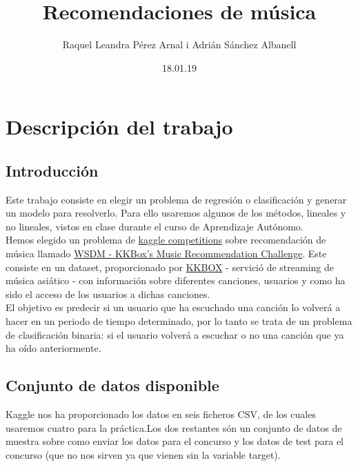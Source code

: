 \documentclass[a4paper]{article}
\title{Recomendaciones de música}
\author{Raquel Leandra Pérez Arnal i Adrián Sánchez Albanell}
\date{18.01.19} %
\begin{document}
\begin{titlepage}
\maketitle
\thispagestyle{empty}
\end{titlepage}
\cleardoublepage
\tableofcontents
\clearpage

\section{Descripción del trabajo}


\subsection{Introducción}
Este trabajo consiste en elegir un problema de regresión o clasificación y generar un modelo para resolverlo. Para ello usaremos algunos de los métodos, lineales y no lineales, vistos en clase durante el curso de Aprendizaje Autónomo.\\
Hemos elegido un problema de \href{https://www.kaggle.com/competitions}{kaggle competitions} sobre recomendación de música llamado \href{https://www.kaggle.com/c/kkbox-music-recommendation-challenge}{WSDM - KKBox's Music Recommendation Challenge}. Este consiste en un dataset, proporcionado por \href{https://www.kkbox.com/intl/index.php?area=intl}{KKBOX} - servició de streaming de música asiático - con información sobre diferentes canciones, usuarios y como ha sido el acceso de los usuarios a dichas canciones.\\
El objetivo es predecir si un usuario que ha escuchado una canción lo volverá a hacer en un periodo de tiempo determinado, por lo tanto se trata de un problema de clasificación binaria: si el usuario volverá a escuchar o no una canción que ya ha oído anteriormente.


\subsection{Conjunto de datos disponible}
Kaggle nos ha proporcionado los datos en seis ficheros CSV, de los cuales usaremos cuatro para la práctica.Los dos restantes són un conjunto de datos de muestra sobre como enviar los datos para el concurso y los datos de test para el concurso (que no nos sirven ya que vienen sin la variable target).
\end{document}
